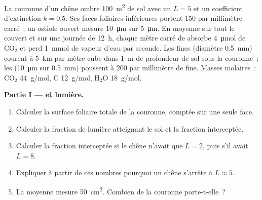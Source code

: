 \begin{problem}
\label{pb:b1:flowering-plant-organization:1}
La couronne d'un chêne ombre \qty{100}{m^2} de sol avec un  $L = 5$ et un coefficient d'extinction $k = 0.5$. Ses faces
foliaires inférieures portent \qty{150}{}  par millimètre
carré~; un ostiole ouvert mesure \qty{10}{\micro m} sur
\qty{5}{\micro m}. En moyenne sur tout le couvert et sur une journée de
\qty{12}{h}, chaque mètre carré de  absorbe
\qty{4}{\micro mol} de $\mathrm{CO_2}$ et perd \qty{1}{mmol} de vapeur
d'eau par seconde. Les  fines (diamètre \qty{0.5}{mm}) courent à
\qty{5}{km} par mètre cube dans \qty{1}{m} de profondeur de sol sous la
couronne~; les  (\qty{10}{\micro m} sur \qty{0.5}{mm})
poussent à \qty{200}{} par millimètre de  fine. Masses molaires~:
$\mathrm{CO_2}$ \qty{44}{g/mol}, C \qty{12}{g/mol},
$\mathrm{H_2O}$ \qty{18}{g/mol}.

\medskip
\noindent\textbf{Partie I ---  et lumière.}
\begin{enumerate}
  \item Calculer la surface foliaire totale de la couronne, comptée sur
        une seule face.
  \item Calculer la fraction de lumière atteignant le sol et la
        fraction interceptée.
  \item Calculer la fraction interceptée si le chêne n'avait que
        $L = 2$, puis s'il avait $L = 8$.
  \item Expliquer à partir de ces nombres pourquoi un chêne s'arrête à
        $L \approx 5$.
  \item La  moyenne mesure \qty{50}{cm^2}. Combien de  la
        couronne porte-t-elle~?
\end{enumerate}


\end{problem}

